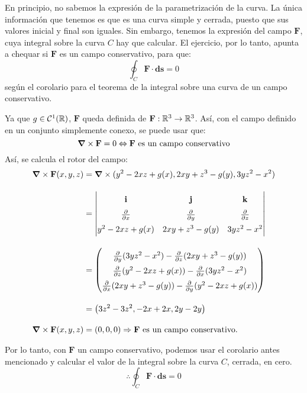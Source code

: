 \begin{solution}
    En principio, no sabemos la expresión de la parametrización de la curva. La única información que tenemos es que es una curva simple y cerrada, puesto que sus valores inicial y final son iguales.
    Sin embargo, tenemos la expresión del campo $\mathbf{F}$, cuya integral sobre la curva $C$ hay que calcular. El ejercicio, por lo tanto, apunta a chequar si $\mathbf{F}$ es un campo conservativo, para que:
    \begin{equation*}
        \oint_{C}\mathbf{F}\cdot\boldsymbol{ds}=0
    \end{equation*}
    según el corolario para el teorema de la integral sobre una curva de un campo conservativo.

    Ya que $g \in \mathcal{C}^1(\mathbb{R})$, $\mathbf{F}$ queda definida de $\mathbf{F}:\mathbb{R}^3\rightarrow\mathbb{R}^3$. Así, con el campo definido en un conjunto simplemente conexo, se puede usar que:
    \begin{equation*}
        \grad \times \mathbf{F} = 0 \Leftrightarrow \mathbf{F} \text{ es un campo conservativo}
    \end{equation*}
    Así, se calcula el rotor del campo:
    \begin{align*}
        \grad \times \mathbf{F}(x,y,z) &= \grad \times (y^2-2xz+g(x),2xy+z^3-g(y),3yz^2-x^2)\\[10pt]
        &=  \renewcommand{\arraystretch}{1.5} \begin{vmatrix}
                \mathbf{i} & \mathbf{j} & \mathbf{k} \\
                \partialx & \partialy & \partialz \\
                y^2-2xz+g(x) & 2xy+z^3-g(y) & 3yz^2-x^2
            \end{vmatrix} \\[10pt]
    &= \renewcommand{\arraystretch}{1.5} \begin{pmatrix}
        \partialy(3yz^2-x^2) - \partialz(2xy+z^3-g(y)) \\
        \partialz(y^2-2xz+g(x)) - \partialx(3yz^2-x^2) \\
        \partialx(2xy+z^3-g(y)) - \partialy(y^2-2xz+g(x))
        \end{pmatrix}\\[10pt]
    &= \left(3z^2-3z^2,-2x+2x,2y-2y\right)\\[10pt]
    \grad \times \mathbf{F}(x,y,z) &= (0,0,0) \Rightarrow \mathbf{F} \text{ es un campo conservativo.}
    \end{align*}

    Por lo tanto, con $\mathbf{F}$ un campo conservativo, podemos usar el corolario antes mencionado y calcular el valor de la integral sobre la curva $C$, cerrada, en cero.
    \begin{equation*}
       \therefore \oint_{C}\mathbf{F}\cdot\boldsymbol{ds}=0
    \end{equation*}
\end{solution}

